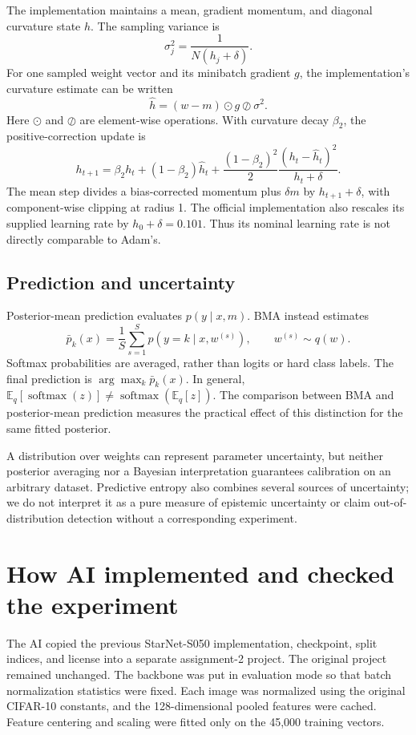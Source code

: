 \documentclass[11pt,a4paper]{article}
\newcommand{\E}{\mathbb{E}}
\begin{document}
The implementation maintains a mean, gradient momentum, and diagonal curvature
state $h$. The sampling variance is
\begin{equation}\label{eq:sigma}
 \sigma_j^2=\frac{1}{N(h_j+\delta)}.
\end{equation}
For one sampled weight vector and its minibatch gradient $g$, the implementation's
curvature estimate can be written
\begin{equation}
 \widehat h=(w-m)\odot g\oslash\sigma^2.
\end{equation}
Here $\odot$ and $\oslash$ are element-wise operations. With curvature decay
$\beta_2$, the positive-correction update is
\begin{equation}
 h_{t+1}=\beta_2h_t+(1-\beta_2)\widehat h_t+
 \frac{(1-\beta_2)^2}{2}\frac{(h_t-\widehat h_t)^2}{h_t+\delta}.
\end{equation}
The mean step divides a bias-corrected momentum plus $\delta m$ by
$h_{t+1}+\delta$, with component-wise clipping at radius 1. The official
implementation also rescales its supplied learning rate by $h_0+\delta=0.101$.
Thus its nominal learning rate is not directly comparable to Adam's.

\subsection{Prediction and uncertainty}
Posterior-mean prediction evaluates $p(y\mid x,m)$. BMA instead estimates
\begin{equation}\label{eq:bma}
 \bar p_k(x)=\frac{1}{S}\sum_{s=1}^S p(y=k\mid x,w^{(s)}),
 \qquad w^{(s)}\sim q(w).
\end{equation}
Softmax probabilities are averaged, rather than logits or hard class labels.
The final prediction is $\arg\max_k\bar p_k(x)$. In general,
$\E_q[\operatorname{softmax}(z)]\ne\operatorname{softmax}(\E_q[z])$.
The comparison between BMA and posterior-mean prediction measures the practical
effect of this distinction for the same fitted posterior.

A distribution over weights can represent parameter uncertainty, but neither
posterior averaging nor a Bayesian interpretation guarantees calibration on an
arbitrary dataset. Predictive entropy also combines several sources of uncertainty;
we do not interpret it as a pure measure of epistemic uncertainty or claim
out-of-distribution detection without a corresponding experiment.

\section{How AI implemented and checked the experiment}
The AI copied the previous StarNet-S050 implementation, checkpoint, split indices,
and license into a separate assignment-2 project. The original project remained
unchanged. The backbone was put in evaluation mode so that batch normalization
statistics were fixed. Each image was normalized using the original CIFAR-10
constants, and the 128-dimensional pooled features were cached. Feature centering
and scaling were fitted only on the 45,000 training vectors.
\end{document}

